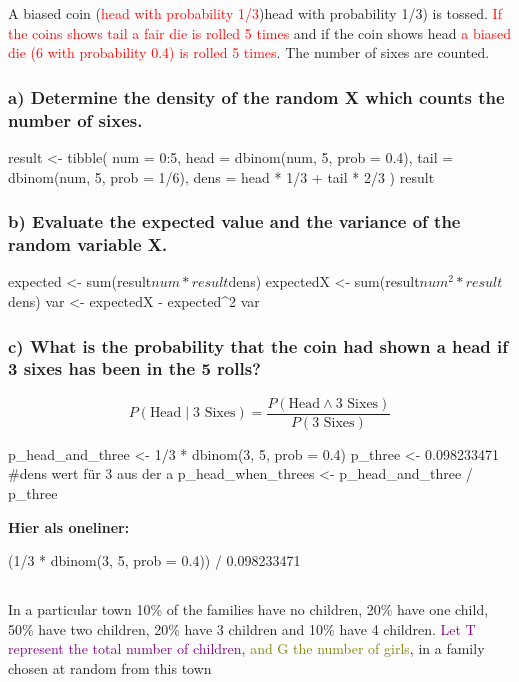 \section{}
\subsection{}
A biased coin (\textcolor{red}{head with probability 1/3})head with probability 1/3) is tossed. \textcolor{red}{If the coins shows tail a fair die is rolled 5 times}
and if the coin shows head \textcolor{red}{a biased die (6 with probability 0.4) is rolled 5 times}. The number of sixes
are counted.
\subsubsection{a) Determine the density of the random X which counts the number of sixes.}
\begin{rcode}{1}
result <- tibble(
    num = 0:5,
    head = dbinom(num, 5, prob = 0.4),
    tail = dbinom(num, 5, prob = 1/6),
    dens = head * 1/3 + tail * 2/3
)
result
\end{rcode}
\subsubsection{b) Evaluate the expected value and the variance of the random variable X.}
\begin{rcode}{1}
expected <- sum(result$num * result$dens)
expectedX <- sum(result$num^2 * result$dens)
var <- expectedX - expected^2
var
\end{rcode}
\subsubsection{c) What is the probability that the coin had shown a head if 3 sixes has been in the 5 rolls?}
$$
P(\text{Head}\mid \text{3 Sixes}) = \frac{P(\text{Head} \land\text{3 Sixes})}{P(\text{3 Sixes})}
$$
\begin{rcode}{1}
p_head_and_three <- 1/3 * dbinom(3, 5, prob = 0.4)
p_three <- 0.098233471 #dens wert für 3 aus der a
p_head_when_threes <- p_head_and_three / p_three
\end{rcode}
\textbf{Hier als oneliner:}
\begin{rcode}{1}
(1/3 * dbinom(3, 5, prob = 0.4)) / 0.098233471
\end{rcode}
\columnbreak
\subsection{}
In a particular town 10\% of the families have no children, 20\% have
one child, 50\% have two children, 20\% have 3 children and 10\% have
4 children. \textcolor{purple}{Let T represent the total number of children}, \textcolor{olive}{and G the
number of girls}, in a family chosen at random from this town
